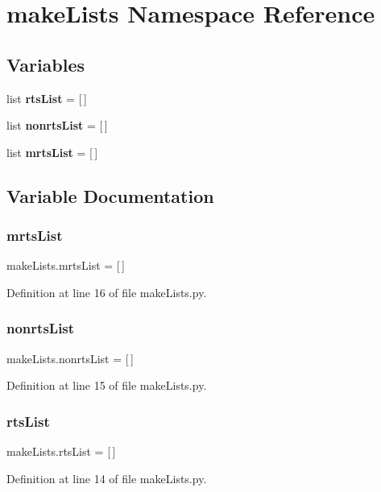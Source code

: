\section{make\+Lists Namespace Reference}
\label{namespacemake_lists}
\subsection*{Variables}
\begin{DoxyCompactItemize}
\item 
list \textbf{ rts\+List} = [$\,$]
\item 
list \textbf{ nonrts\+List} = [$\,$]
\item 
list \textbf{ mrts\+List} = [$\,$]
\end{DoxyCompactItemize}


\subsection{Variable Documentation}
\mbox{\label{namespacemake_lists_a0fdd4d74424c409e146f4f49a4d37efe}} 
\subsubsection{mrts\+List}
{\footnotesize\ttfamily make\+Lists.\+mrts\+List = [$\,$]}



Definition at line 16 of file make\+Lists.\+py.

\mbox{\label{namespacemake_lists_a4949a4f1c11520e87a0027f400f6e3bc}} 
\subsubsection{nonrts\+List}
{\footnotesize\ttfamily make\+Lists.\+nonrts\+List = [$\,$]}



Definition at line 15 of file make\+Lists.\+py.

\mbox{\label{namespacemake_lists_a67c0c3114ac546a83affe567cd6a538b}} 
\subsubsection{rts\+List}
{\footnotesize\ttfamily make\+Lists.\+rts\+List = [$\,$]}



Definition at line 14 of file make\+Lists.\+py.

